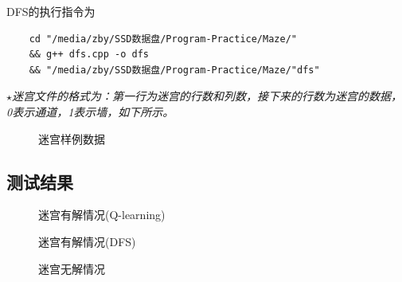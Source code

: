 \documentclass[UTF8,titlepage]{ctexart}
\numberwithin{figure}{section}
\begin{document}
DFS的执行指令为
\begin{verbatim}
    cd "/media/zby/SSD数据盘/Program-Practice/Maze/" 
    && g++ dfs.cpp -o dfs 
    && "/media/zby/SSD数据盘/Program-Practice/Maze/"dfs"
\end{verbatim}
\emph{$\star$迷宫文件的格式为：第一行为迷宫的行数和列数，接下来的行数为迷宫的数据，0表示通道，1表示墙，如下所示。}
\begin{figure}[H]
\centering
 \caption{迷宫样例数据}
 \label{}
\end{figure}

\subsection{测试结果}
\begin{figure}[H]
\centering
 \caption{迷宫有解情况(Q-learning)}
 \label{}
\end{figure}

\begin{figure}[H]
\centering
 \caption{迷宫有解情况(DFS)}
 \label{}
\end{figure}
\begin{figure}[H]
\centering
 \caption{迷宫无解情况}
 \label{}
\end{figure}
\end{document}
